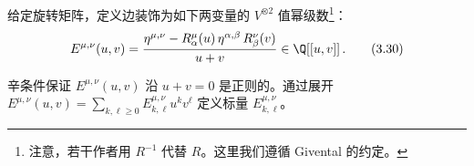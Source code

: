 给定旋转矩阵，定义边装饰为如下两变量的 $V^{\otimes 2}$ 值幂级数\footnote{注意，若干作者用 $R^{-1}$ 代替 $R$。这里我们遵循 Givental 的约定。}：
\begin{equation}
  E^{\mu,\nu}(u,v)=\frac{\eta^{\mu,\nu}-R^{\mu}_{\alpha}(u)\,\eta^{\alpha,\beta}\,R^{\nu}_{\beta}(v)}{u+v}\in\Q[[u,v]]\,.
  \tag{3.30}
\end{equation}

辛条件保证 $E^{\mu,\nu}(u,v)$ 沿 $u+v=0$ 是正则的。通过展开 $E^{\mu,\nu}(u,v)=\sum_{k,\ell\ge0}E^{\mu,\nu}_{k,\ell}u^{k}v^{\ell}$ 定义标量 $E^{\mu,\nu}_{k,\ell}$。

